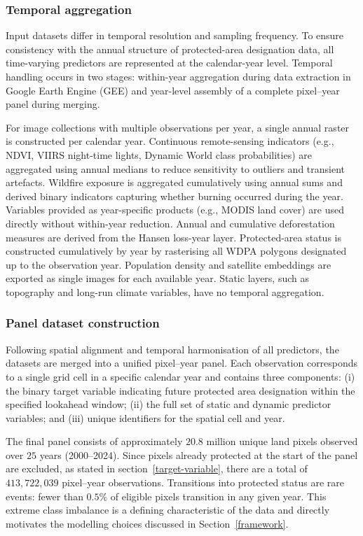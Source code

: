 \documentclass[12pt]{article}
\theoremstyle{break} %
\begin{document}
\subsubsection{Temporal aggregation}
\label{temporal-aggregation}

Input datasets differ in temporal resolution and sampling frequency. To ensure consistency with the annual structure of protected-area designation data, all time-varying predictors are represented at the calendar-year level. Temporal handling occurs in two stages: within-year aggregation during data extraction in Google Earth Engine (GEE) and year-level assembly of a complete pixel--year panel during merging.

For image collections with multiple observations per year, a single annual raster is constructed per calendar year. Continuous remote-sensing indicators (e.g., NDVI, VIIRS night-time lights, Dynamic World class probabilities) are aggregated using annual medians to reduce sensitivity to outliers and transient artefacts. Wildfire exposure is aggregated cumulatively using annual sums and derived binary indicators capturing whether burning occurred during the year. Variables provided as year-specific products (e.g., MODIS land cover) are used directly without within-year reduction. Annual and cumulative deforestation measures are derived from the Hansen loss-year layer. Protected-area status is constructed cumulatively by year by rasterising all WDPA polygons designated up to the observation year. Population density and satellite embeddings are exported as single images for each available year. Static layers, such as topography and long-run climate variables, have no temporal aggregation.

\subsubsection{Panel dataset construction}
\label{panel-construction}

Following spatial alignment and temporal harmonisation of all predictors, the datasets are merged into a unified pixel--year panel. Each observation corresponds to a single grid cell in a specific calendar year and contains three components: (i) the binary target variable indicating future protected area designation within the specified lookahead window; (ii) the full set of static and dynamic predictor variables; and (iii) unique identifiers for the spatial cell and year.

The final panel consists of approximately $20.8$ million unique land pixels observed over $25$ years (2000--2024). Since pixels already protected at the start of the panel are excluded, as stated in section~\ref{target-variable}, there are a total of $413{,}722{,}039$ pixel--year observations. Transitions into protected status are rare events: fewer than $0.5\%$ of eligible pixels transition in any given year. This extreme class imbalance is a defining characteristic of the data and directly motivates the modelling choices discussed in Section~\ref{framework}.
\end{document}
